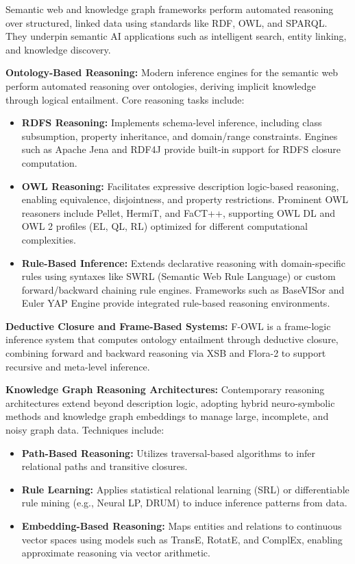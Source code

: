 \documentclass[12pt,a4paper]{article}
\begin{document}
Semantic web and knowledge graph frameworks perform automated reasoning over structured, linked data using standards like RDF, OWL, and SPARQL. They underpin semantic AI applications such as intelligent search, entity linking, and knowledge discovery.

\textbf{Ontology-Based Reasoning:} Modern inference engines for the semantic web perform automated reasoning over ontologies, deriving implicit knowledge through logical entailment. Core reasoning tasks include:

\begin{itemize}
    \item \textbf{RDFS Reasoning:} Implements schema-level inference, including class subsumption, property inheritance, and domain/range constraints. Engines such as Apache Jena and RDF4J provide built-in support for RDFS closure computation.
    \item \textbf{OWL Reasoning:} Facilitates expressive description logic-based reasoning, enabling equivalence, disjointness, and property restrictions. Prominent OWL reasoners include Pellet, HermiT, and FaCT++, supporting OWL DL and OWL 2 profiles (EL, QL, RL) optimized for different computational complexities.
    \item \textbf{Rule-Based Inference:} Extends declarative reasoning with domain-specific rules using syntaxes like SWRL (Semantic Web Rule Language) or custom forward/backward chaining rule engines. Frameworks such as BaseVISor and Euler YAP Engine provide integrated rule-based reasoning environments.
\end{itemize}

\textbf{Deductive Closure and Frame-Based Systems:} F-OWL is a frame-logic inference system that computes ontology entailment through deductive closure, combining forward and backward reasoning via XSB and Flora-2 to support recursive and meta-level inference.

\textbf{Knowledge Graph Reasoning Architectures:} Contemporary reasoning architectures extend beyond description logic, adopting hybrid neuro-symbolic methods and knowledge graph embeddings to manage large, incomplete, and noisy graph data. Techniques include:

\begin{itemize}
    \item \textbf{Path-Based Reasoning:} Utilizes traversal-based algorithms to infer relational paths and transitive closures.
    \item \textbf{Rule Learning:} Applies statistical relational learning (SRL) or differentiable rule mining (e.g., Neural LP, DRUM) to induce inference patterns from data.
    \item \textbf{Embedding-Based Reasoning:} Maps entities and relations to continuous vector spaces using models such as TransE, RotatE, and ComplEx, enabling approximate reasoning via vector arithmetic.
\end{itemize}
\end{document}
